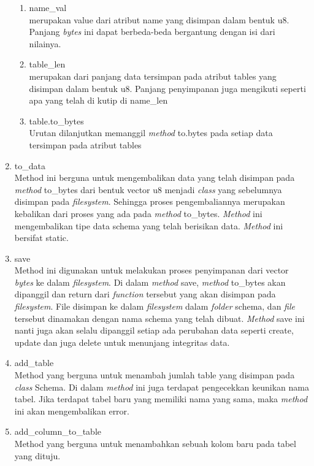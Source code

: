 \begin{enumerate}
\begin{enumerate}
		\item name\_val \\
		merupakan value dari atribut name yang disimpan dalam bentuk u8. Panjang \emph{bytes} ini dapat berbeda-beda bergantung dengan isi dari nilainya. 

		\item table\_len \\
		merupakan dari panjang data tersimpan pada atribut tables yang disimpan dalam bentuk u8. Panjang penyimpanan juga mengikuti seperti apa yang telah di kutip di name\_len

		\item table.to\_bytes \\
		Urutan dilanjutkan memanggil \emph{method} to.bytes pada setiap data tersimpan pada atribut tables
	\end{enumerate}


	\item to\_data \\
	Method ini berguna untuk mengembalikan data yang telah disimpan pada \emph{method} to\_bytes dari bentuk vector u8 menjadi \emph{class} yang sebelumnya disimpan pada \emph{filesystem}. 
  Sehingga proses pengembaliannya merupakan kebalikan dari proses yang ada pada \emph{method} to\_bytes. \emph{Method} ini mengembalikan tipe data schema yang telah berisikan data. \emph{Method} ini bersifat
  static.

	\item save \\	
	Method ini digunakan untuk melakukan proses penyimpanan dari vector \emph{bytes} ke dalam \emph{filesystem}. Di dalam \emph{method} save, \emph{method} to\_bytes akan dipanggil dan return dari \emph{function} tersebut
  yang akan disimpan pada \emph{filesystem}. File disimpan ke dalam \emph{filesystem} dalam \emph{folder} schema, dan \emph{file} tersebut dinamakan dengan nama schema yang telah dibuat. \emph{Method} save ini nanti 
  juga akan selalu dipanggil setiap ada perubahan data seperti create, update dan juga delete untuk menunjang integritas data.

	\item add\_table \\
	Method yang berguna untuk menambah jumlah table yang disimpan pada \emph{class} Schema. Di dalam \emph{method} ini juga terdapat pengecekkan keunikan nama tabel. Jika terdapat tabel baru yang memiliki
  nama yang sama, maka \emph{method} ini akan mengembalikan error.

	\item add\_column\_to\_table \\
	Method yang berguna untuk menambahkan sebuah kolom baru pada tabel yang dituju.


\end{enumerate}
